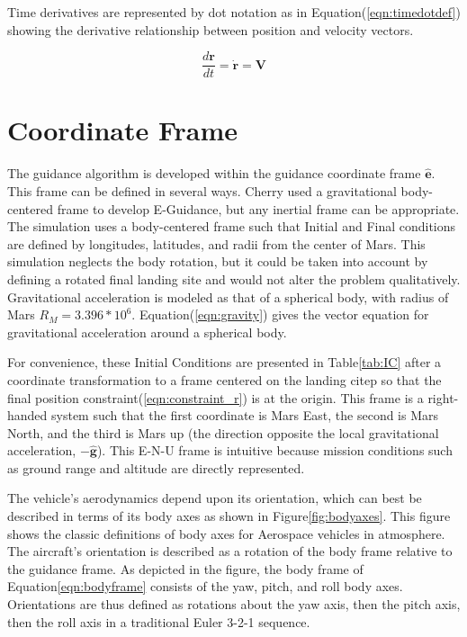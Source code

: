 Time derivatives are represented by dot notation as in Equation\:(\ref{eqn:timedotdef}) showing the derivative relationship between position and velocity vectors.

\begin{equation}
\label{eqn:timedotdef}
\frac{d\bm{r}}{dt} = \dot{\bm{r}} = \bm{V}
\end{equation}


\section{Coordinate Frame}
The guidance algorithm is developed within the guidance coordinate frame $\bm{\hat{e}}$. This frame can be defined in several ways. Cherry\:\cite{CHERRY} used a gravitational body-centered frame to develop E-Guidance, but any inertial frame can be appropriate. The simulation uses a body-centered frame such that Initial and Final conditions are defined by longitudes, latitudes, and radii from the center of Mars. This simulation neglects the body rotation, but it could be taken into account by defining a rotated final landing site and would not alter the problem qualitatively. Gravitational acceleration is modeled as that of a spherical body, with radius of Mars $R_M = 3.396*10^6$. Equation\:(\ref{eqn:gravity}) gives the vector equation for gravitational acceleration around a spherical body.

For convenience, these Initial Conditions are presented in Table\:\ref{tab:IC} after a coordinate transformation to a frame centered on the landing citep so that the final position constraint\:(\ref{eqn:constraint_r}) is at the origin. This frame is a right-handed system such that the first coordinate is Mars East, the second is Mars North, and the third is Mars up (the direction opposite the local gravitational acceleration, $-\hat{\bm{g}}$). This E-N-U frame is intuitive because mission conditions such as ground range and altitude are directly represented.  

The vehicle's aerodynamics depend upon its orientation, which can best be described in terms of its body axes as shown in Figure\:\ref{fig:bodyaxes}\:\cite{BODYAXES}. This figure shows the classic definitions of body axes for Aerospace vehicles in atmosphere. The aircraft's orientation is described as a rotation of the body frame relative to the guidance frame. As depicted in the figure, the body frame of Equation\:\ref{eqn:bodyframe} consists of the yaw, pitch, and roll body axes. Orientations are thus defined as rotations about the yaw axis, then the pitch axis, then the roll axis in a traditional Euler 3-2-1 sequence.

